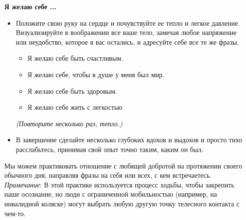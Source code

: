 {\large \textbf{Я желаю себе ...}}
\begin{itemize}
	\item Положите свою руку на сердце и почувствуйте ее тепло и легкое давление. Визуализируйте в воображении все ваше тело, замечая любое напряжение или неудобство, которое в вас остались, и адресуйте себе все те же фразы.
	\begin{itemize}
		\item Я желаю себе быть счастливым.
		\item Я желаю себе, чтобы в душе у меня был мир.
		\item Я желаю себе быть здоровым.
		\item Я желаю себе жить с легкостью
	\end{itemize}
	\emph{(Повторите несколько раз, тепло.)}
	\item В завершение сделайте несколько глубоких вдохов и выдохов и просто тихо расслабьтесь, принимая свой опыт точно таким, каким он был. 
\end{itemize}

\newpage
{}

\newpage
{} \label{IP:Walking_in_Loving-Kindness}
Мы можем практиковать отношение с любящей добротой на протяжении своего обычного дня, направляя фразы на себя или всех, с кем встречаетесь. \emph{Примечание}: В этой практике используется процесс ходьбы, чтобы закрепить наше осознание, но люди с ограниченной мобильностью (например, на инвалидной коляске) могут выбрать любую другую точку телесного контакта с чем-то.

